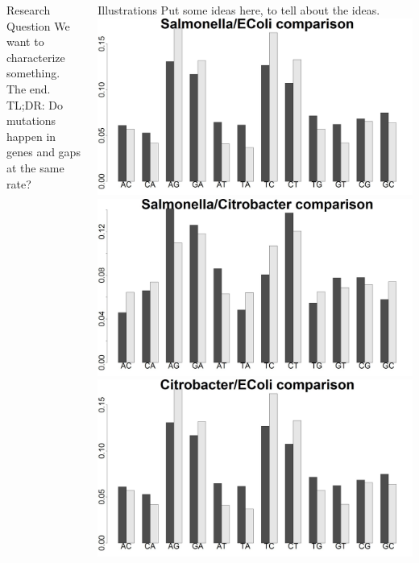 \documentclass[final]{beamer}
\begin{document}
\begin{frame}{}
\begin{columns}[t]
\begin{column}{.32 \linewidth}
 \begin{block}{\large Research Question}
	{\color{red} We want to characterize something. }
                       The end.
                       \newline
                       TL;DR: Do mutations happen in genes and gaps at the same rate?
	\end{block}

\end{column}


\begin{column}{.32 \linewidth}

\begin{block}{\large Illustrations}
Put some ideas here, to tell about the ideas.
	\includegraphics[scale = .455]{SalECPercentage.jpeg}
	\newline
 \includegraphics[scale = .455]{CBSalPercentage.jpeg}
 \newline
 \includegraphics[scale = .455]{CBECPercentage.jpeg}

\end{block}
\end{column}
\end{columns}
\end{frame}
\end{document}
